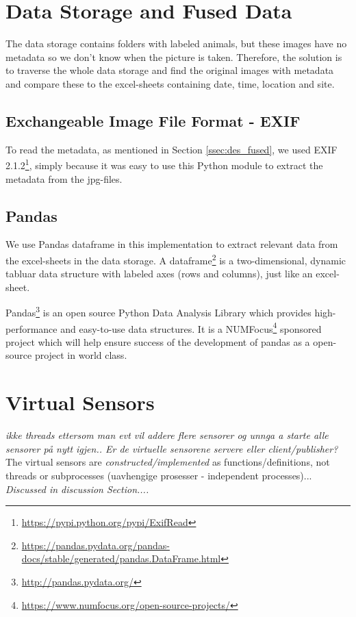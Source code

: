 \documentclass[USenglish]{uit-thesis}
\begin{document}

\section{Data Storage and Fused Data} \label{ssec:storage_fused}
The data storage contains folders with labeled animals, but these images have no metadata so we don't know when the picture is taken. Therefore, the solution is to traverse the whole data storage and find the original images with metadata and compare these to the excel-sheets containing date, time, location and site.

\subsection{Exchangeable Image File Format - EXIF}
To read the metadata, as mentioned in Section \ref{ssec:des_fused}, we used EXIF 2.1.2\footnote{\url{https://pypi.python.org/pypi/ExifRead}}, simply because it was easy to use this Python module to extract the metadata from the jpg-files.

\subsection{Pandas}
We use Pandas dataframe in this implementation to extract relevant data from the excel-sheets in the data storage. A dataframe\footnote{\url{https://pandas.pydata.org/pandas-docs/stable/generated/pandas.DataFrame.html}} is a two-dimensional, dynamic tabluar data structure with labeled axes (rows and columns), just like an excel-sheet.

Pandas\footnote{\url{http://pandas.pydata.org/}} is an open source Python Data Analysis Library which provides high-performance and easy-to-use data structures. It is a NUMFocus\footnote{\url{https://www.numfocus.org/open-source-projects/}} sponsored project which will help ensure success of the development of pandas as a open-source project in world class. 


\section{Virtual Sensors} \label{vsensor}
\textit{ikke threads ettersom man evt vil addere flere sensorer og unnga a starte alle sensorer på nytt igjen..
Er de virtuelle sensorene servere eller client/publisher?}
The virtual sensors are \textit{constructed/implemented} as functions/definitions, not threads or subprocesses (uavhengige prosesser - independent processes)... \textit{Discussed in discussion Section....}
\end{document}
